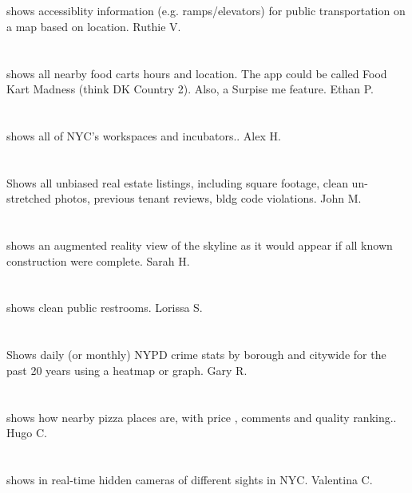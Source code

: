 \section{}shows accessiblity information (e.g. ramps/elevators) for public transportation on a map based on location. Ruthie V.
\section{}  shows all nearby food carts hours and location. The app could be called Food Kart Madness (think DK Country 2). Also,  a Surpise me feature. Ethan P.
\section{}shows all of NYC's workspaces and incubators.. Alex H.
\section{}Shows all unbiased real estate listings,  including square footage,  clean un-stretched photos,  previous tenant reviews,  bldg code violations. John M.
\section{}shows an augmented reality view of the skyline as it would appear if all known construction were complete. Sarah H.
\section{} shows clean public restrooms. Lorissa S.
\section{}Shows daily (or monthly)  NYPD crime stats by borough and citywide for the past 20 years using a heatmap or graph. Gary R.
\section{}shows how nearby pizza places are,  with price ,  comments and quality ranking.. Hugo C.
\section{}shows in real-time hidden cameras of different sights in NYC. Valentina C.
